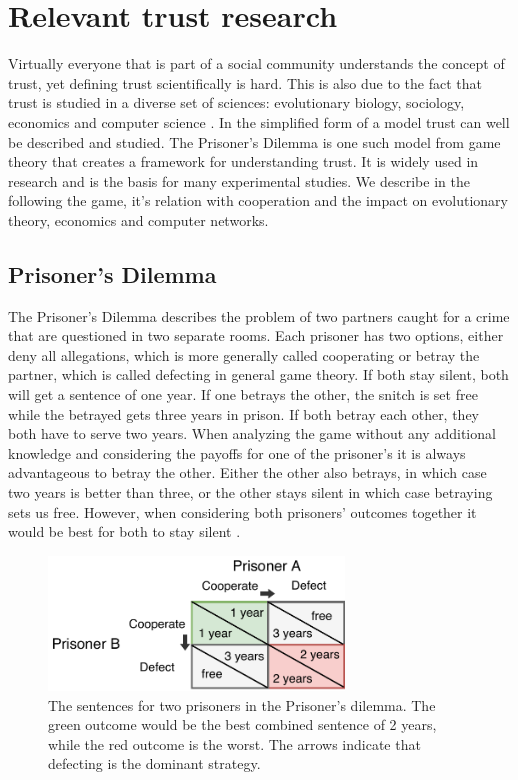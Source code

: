 \section{Relevant trust research}
Virtually everyone that is part of a social community understands the concept of trust, yet defining
trust scientifically is hard. This is also due to the fact that trust is studied in a diverse set 
of sciences: evolutionary biology, sociology, economics and computer science \cite{shockley2015interdisciplinary}. In the simplified
form of a model trust can well be described and studied. The Prisoner's 
Dilemma \cite{rapoport1965prisoner} is one such model from game theory that creates a framework for 
understanding trust. It is widely used in research and is the basis for many experimental studies.
We describe in the following the game, it's relation with cooperation and the impact on evolutionary
theory, economics and computer networks.

\subsection{Prisoner's Dilemma}
\label{sec:prisoner}
The Prisoner's Dilemma describes the problem of two partners caught for a crime that are questioned in two separate rooms. 
Each prisoner has two options, either deny all allegations, which is more generally called cooperating
 or betray the partner, which is called defecting in general game theory. If both stay 
silent, both will get a sentence of one year. If one betrays the other, the snitch is set free while the 
betrayed gets three years in prison. If both betray each other, they both have to serve two years.
When analyzing the game without any additional knowledge and considering the payoffs for one of the
prisoner's it is always advantageous to betray the other. Either the other also betrays, in which case
two years is better than three, or the other stays silent in which case betraying sets us free. 
However, when considering both prisoners' outcomes together it would be best for both to stay silent
\cite{rapoport1965prisoner}.

\begin{figure}
    \centering
    \includegraphics[width=0.7\textwidth]{images/prisoners_dilemma.pdf}
    \caption{The sentences for two prisoners in the Prisoner's dilemma. The green outcome would be 
    the best combined sentence of 2 years, while the red outcome is the worst. The arrows indicate that defecting is the dominant strategy.}
\end{figure}

